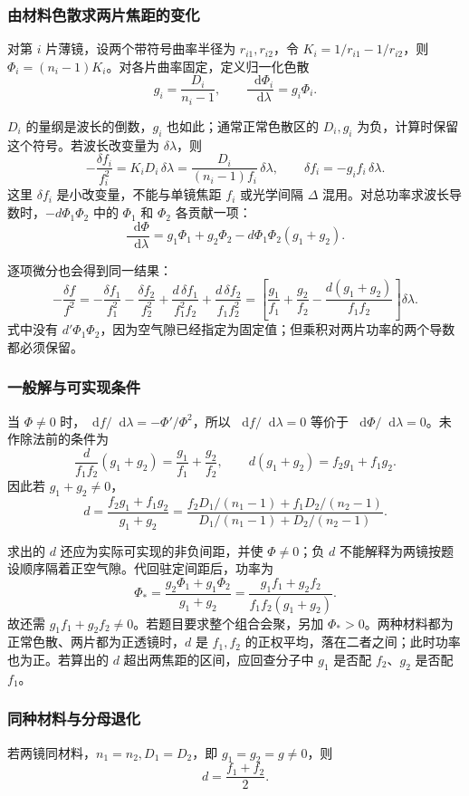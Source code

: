 \documentclass[UTF8,fontset=fandol,a4paper,11pt]{ctexart}
\newcommand{\dd}{\mathop{}\!\mathrm{d}}
\begin{document}
\subsubsection*{由材料色散求两片焦距的变化}
对第 $i$ 片薄镜，设两个带符号曲率半径为 $r_{i1},r_{i2}$，令 $K_i=1/r_{i1}-1/r_{i2}$，则 $\Phi_i=(n_i-1)K_i$。对各片曲率固定，定义归一化色散
\[
g_i=\frac{D_i}{n_i-1},\qquad
\frac{\dd\Phi_i}{\dd\lambda}=g_i\Phi_i.
\]

$D_i$ 的量纲是波长的倒数，$g_i$ 也如此；通常正常色散区的 $D_i,g_i$ 为负，计算时保留这个符号。若波长改变量为 $\delta\lambda$，则
\[
-\frac{\delta f_i}{f_i^2}=K_iD_i\,\delta\lambda
=\frac{D_i}{(n_i-1)f_i}\,\delta\lambda,
\qquad \delta f_i=-g_if_i\,\delta\lambda.
\]
这里 $\delta f_i$ 是小改变量，不能与单镜焦距 $f_i$ 或光学间隔 $\Delta$ 混用。对总功率求波长导数时，$-d\Phi_1\Phi_2$ 中的 $\Phi_1$ 和 $\Phi_2$ 各贡献一项：
\[
\frac{\dd\Phi}{\dd\lambda}
=g_1\Phi_1+g_2\Phi_2
-d\Phi_1\Phi_2(g_1+g_2).
\]

逐项微分也会得到同一结果：
\[
-\frac{\delta f}{f^2}
=-\frac{\delta f_1}{f_1^2}-\frac{\delta f_2}{f_2^2}
+\frac{d\,\delta f_1}{f_1^2f_2}+\frac{d\,\delta f_2}{f_1f_2^2}
=\left[\frac{g_1}{f_1}+\frac{g_2}{f_2}
-\frac{d(g_1+g_2)}{f_1f_2}\right]\delta\lambda.
\]
式中没有 $d'\Phi_1\Phi_2$，因为空气隙已经指定为固定值；但乘积对两片功率的两个导数都必须保留。

\subsubsection*{一般解与可实现条件}
当 $\Phi\ne0$ 时，$\dd f/\dd\lambda=-\Phi'/\Phi^2$，所以 $\dd f/\dd\lambda=0$ 等价于 $\dd\Phi/\dd\lambda=0$。未作除法前的条件为
\[
\frac{d}{f_1f_2}(g_1+g_2)=\frac{g_1}{f_1}+\frac{g_2}{f_2},
\qquad d(g_1+g_2)=f_2g_1+f_1g_2.
\]
因此若 $g_1+g_2\ne0$，
\[
\boxed{d=
\frac{f_2g_1+f_1g_2}{g_1+g_2}
=\frac{f_2D_1/(n_1-1)+f_1D_2/(n_2-1)}
{D_1/(n_1-1)+D_2/(n_2-1)}}.
\]

求出的 $d$ 还应为实际可实现的非负间距，并使 $\Phi\ne0$；负 $d$ 不能解释为两镜按题设顺序隔着正空气隙。代回驻定间距后，功率为
\[
\Phi_*=\frac{g_2\Phi_1+g_1\Phi_2}{g_1+g_2}
=\frac{g_1f_1+g_2f_2}{f_1f_2(g_1+g_2)}.
\]
故还需 $g_1f_1+g_2f_2\ne0$。若题目要求整个组合会聚，另加 $\Phi_*>0$。两种材料都为正常色散、两片都为正透镜时，$d$ 是 $f_1,f_2$ 的正权平均，落在二者之间；此时功率也为正。若算出的 $d$ 超出两焦距的区间，应回查分子中 $g_1$ 是否配 $f_2$、$g_2$ 是否配 $f_1$。

\subsubsection*{同种材料与分母退化}
若两镜同材料，$n_1=n_2,D_1=D_2$，即 $g_1=g_2=g\ne0$，则
\[
\boxed{d=\frac{f_1+f_2}{2}}.
\]
\end{document}
